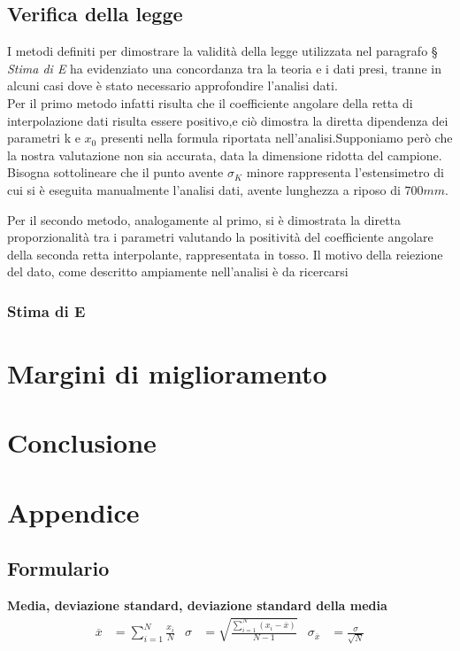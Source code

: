 \documentclass[a4paper,11pt,oneside]{article}
\begin{document}
\subsection{Verifica della legge}
I metodi definiti per dimostrare la validità della legge utilizzata nel paragrafo \S \textit{ Stima di E} ha evidenziato una concordanza tra la teoria e i dati presi, tranne in alcuni casi dove è stato necessario approfondire l'analisi dati.\\
Per il primo metodo infatti risulta che il coefficiente angolare della retta di interpolazione dati risulta essere positivo,e ciò dimostra la diretta dipendenza dei parametri k e $x_0$ presenti nella formula riportata nell'analisi.Supponiamo però che la nostra valutazione non sia accurata, data la dimensione ridotta del campione.
Bisogna sottolineare che il punto avente $\sigma_K$ minore rappresenta l'estensimetro di cui si è eseguita manualmente l'analisi dati, avente lunghezza a riposo di $700\si{mm}$.


Per il secondo metodo, analogamente al primo, si è dimostrata la diretta proporzionalità tra i parametri valutando la positività del coefficiente angolare della seconda retta interpolante, rappresentata in tosso. Il motivo della reiezione del dato, come descritto ampiamente nell'analisi è da ricercarsi 





\subsubsection*{Stima di E}



\section{Margini di miglioramento}

\section{Conclusione}

\section{Appendice}

\subsection{Formulario}
\textbf{Media, deviazione standard, deviazione standard della media}
\begin{align*}
        \overline{x}&=\sum\limits_{i=1}^{N} \frac{x_{i}}{N}&
        \sigma&=\sqrt{\frac{\sum\limits_{i=1}^{N} (x_{i}-\overline{x})}{N-1}}&
        \sigma_{\overline{x}}&=\frac{\sigma}{\sqrt{N}}
\end{align*}\\
\end{document}
